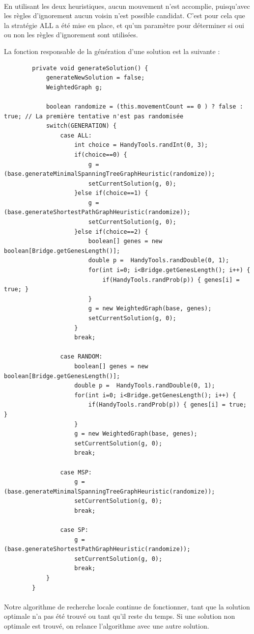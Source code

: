		\paragraph{}

	En utilisant les deux heuristiques, aucun mouvement n'est accomplie, puisqu'avec les règles d'ignorement aucun voisin n'est possible candidat. C'est pour cela
que la stratégie ALL a été mise en place, et qu'un paramètre pour déterminer si oui ou non les règles d'ignorement sont utilisées.

	La fonction responsable de la génération d'une solution est la suivante :
		\begin{lstlisting}
		private void generateSolution() {
			generateNewSolution = false;
			WeightedGraph g;

			boolean randomize = (this.movementCount == 0 ) ? false : true; // La première tentative n'est pas randomisée
			switch(GENERATION) {
				case ALL:
					int choice = HandyTools.randInt(0, 3);
					if(choice==0) {
						g = (base.generateMinimalSpanningTreeGraphHeuristic(randomize));
						setCurrentSolution(g, 0);
					}else if(choice==1) {
						g = (base.generateShortestPathGraphHeuristic(randomize));
						setCurrentSolution(g, 0);
					}else if(choice==2) {
						boolean[] genes = new boolean[Bridge.getGenesLength()];
						double p =  HandyTools.randDouble(0, 1);
						for(int i=0; i<Bridge.getGenesLength(); i++) {
							if(HandyTools.randProb(p)) { genes[i] = true; }
						}
						g = new WeightedGraph(base, genes);
						setCurrentSolution(g, 0);
					}
					break;
				
				case RANDOM:
					boolean[] genes = new boolean[Bridge.getGenesLength()];
					double p =  HandyTools.randDouble(0, 1);
					for(int i=0; i<Bridge.getGenesLength(); i++) {
						if(HandyTools.randProb(p)) { genes[i] = true; }
					}
					g = new WeightedGraph(base, genes);
					setCurrentSolution(g, 0);
					break;

				case MSP:
					g = (base.generateMinimalSpanningTreeGraphHeuristic(randomize));
					setCurrentSolution(g, 0);
					break;

				case SP:
					g = (base.generateShortestPathGraphHeuristic(randomize));
					setCurrentSolution(g, 0);
					break;
			}
		}
		\end{lstlisting}

	\paragraph{} Notre algorithme de recherche locale continue de fonctionner, tant que la solution optimale n'a pas été trouvé ou tant qu'il reste du temps. Si une solution non optimale est trouvé, on relance l'algorithme
avec une autre solution.

